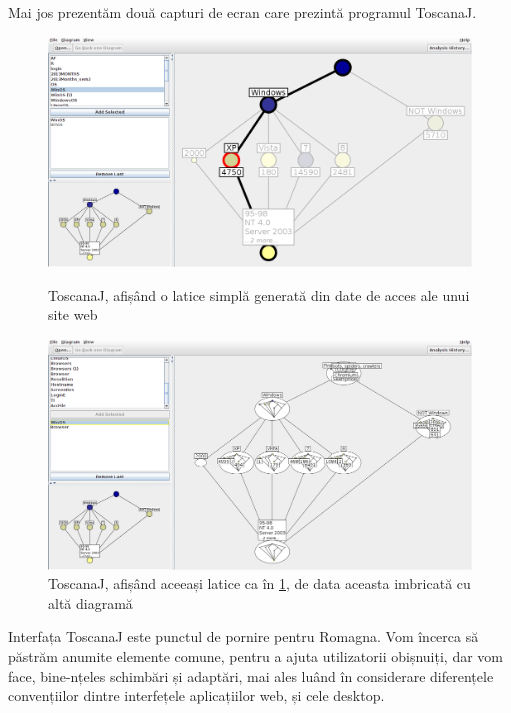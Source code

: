 \documentclass[12pt, a4paper, twoside, romanian]{teza-upb}
\begin{document}
        Mai jos prezentăm două capturi de ecran care prezintă programul ToscanaJ.

        \begin{figure}[h]
          \centering
          \includegraphics[width=\textwidth, natwidth=1366, natheight=744]{toscanaj-1.png} \\ 
          \caption{ToscanaJ, afișând o latice simplă generată din date de acces ale unui site web}
          \label{screenshot:toscana-1}
        \end{figure}
        \begin{figure}[h]
          \centering
          \includegraphics[width=\textwidth, natwidth=1366, natheight=744]{toscanaj-2.png}
          \caption{ToscanaJ, afișând aceeași latice ca în \ref{screenshot:toscana-1}, de data aceasta imbricată cu altă diagramă}
          \label{screenshot:toscana-2}
        \end{figure}

        Interfața ToscanaJ este punctul de pornire pentru Romagna. Vom încerca să păstrăm anumite elemente comune, pentru a ajuta utilizatorii obișnuiți, dar vom face, bine-nțeles schimbări și adaptări, mai ales luând în considerare diferențele convențiilor dintre interfețele aplicațiilor web, și cele desktop.
\end{document}
